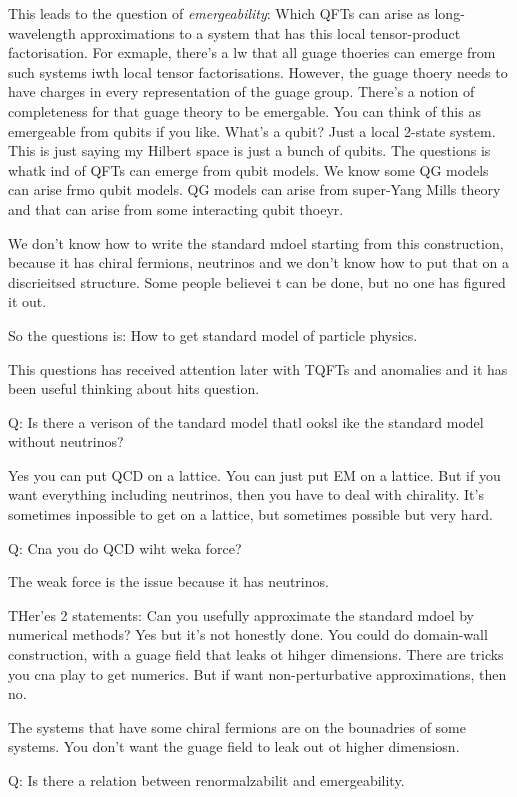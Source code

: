 This leads to the question of \emph{emergeability}:
Which QFTs can arise as long-wavelength approximations to a system that has this
local tensor-product factorisation.
For exmaple, there's a lw that all guage thoeries can emerge from such systems
iwth local tensor factorisations. 
However, the guage thoery needs to have charges in every representation of the
guage group.
There's a notion of completeness for that guage theory to be emergable.
You can think of this as emergeable from qubits if you like.
What's a qubit?
Just a local 2-state system.
This is just saying my Hilbert space is just a bunch of qubits.
The questions is whatk ind of QFTs can emerge from qubit models.
We know some QG models can arise frmo qubit models.
QG models can arise from super-Yang Mills theory and that can arise from some
interacting qubit thoeyr.

We don't know how to write the standard mdoel starting from this construction,
because it has chiral fermions, neutrinos and we don't know how to put that on a
discrieitsed structure.
Some people believei t can be done, but no one has figured it out.

So the questions is: How to get standard model of particle physics.

This questions has received attention later with TQFTs and anomalies and it has
been useful thinking about hits question.

Q: Is there a verison of the tandard model thatl ooksl ike the standard model
without neutrinos?

Yes you can put QCD on a lattice.
You can just put EM on a lattice.
But if you want everything including neutrinos,
then you have to deal with chirality.
It's sometimes inpossible to get on a lattice, but sometimes possible but very
hard.

Q: Cna you do QCD wiht weka force?

The weak force is the issue because it has neutrinos.

THer'es 2 statements: Can you usefully approximate the standard mdoel by
numerical methods? Yes but it's not honestly done.
You could do domain-wall construction, with a guage field that leaks ot hihger
dimensions.
There are tricks you cna play to get numerics.
But if want non-perturbative approximations, then no.

The systems that have some chiral fermions are on the bounadries of some
systems.
You don't want the guage field to leak out ot higher dimensiosn.

Q: Is there a relation between renormalzabilit and emergeability.

